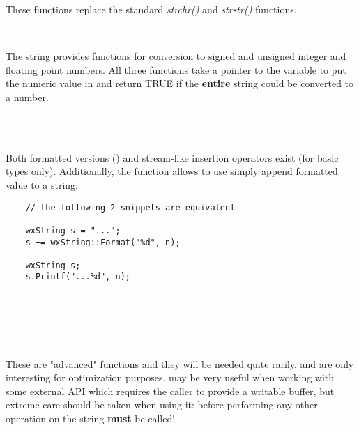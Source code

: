 These functions replace the standard {\it strchr()} and {\it strstr()} 
functions.

\\


The string provides functions for conversion to signed and unsigned integer and
floating point numbers. All three functions take a pointer to the variable to
put the numeric value in and return TRUE if the {\bf entire} string could be
converted to a number.

\\
\\


Both formatted versions () and stream-like
insertion operators exist (for basic types only). Additionally, the 
 function allows to use simply append
formatted value to a string:

\begin{verbatim}
    // the following 2 snippets are equivalent

    wxString s = "...";
    s += wxString::Format("%d", n);

    wxString s;
    s.Printf("...%d", n);
\end{verbatim}

\\
\\
\\
\\


These are "advanced" functions and they will be needed quite rarily. 
 and  are only
interesting for optimization purposes. 
 may be very useful when working with
some external API which requires the caller to provide a writable buffer, but
extreme care should be taken when using it: before performing any other
operation on the string  {\bf
must} be called!

